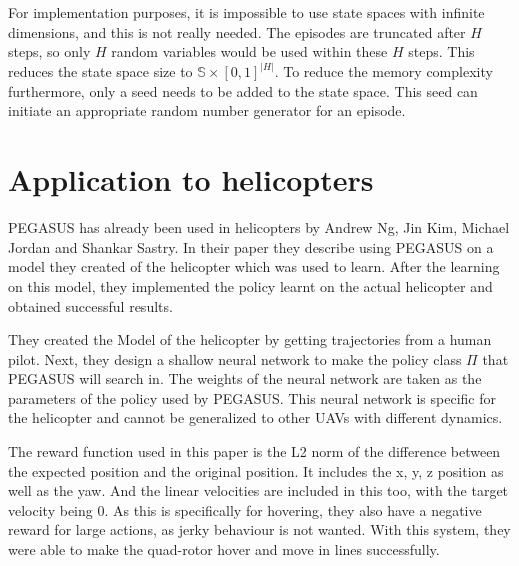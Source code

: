 \documentclass[hidelinks,BTech]{iitmdiss}
\begin{document}
For implementation purposes, it is impossible to use state spaces with infinite dimensions, and this is not really needed. The episodes are truncated after $H$ steps, so only $H$ random variables would be used within these $H$ steps. This reduces the state space size to $\mathbb{S} \times [0,1]^{|H|}$. To reduce the memory complexity furthermore, only a seed needs to be added to the state space. This seed can initiate an appropriate random number generator for an episode.

\section{Application to helicopters}

PEGASUS has already been used in helicopters \cite{HelicopterPegasus}  by Andrew Ng, Jin Kim, Michael Jordan and Shankar Sastry. In their paper they describe using PEGASUS on a model they created of the helicopter which was used to learn. After the learning on this model, they implemented the policy learnt on the actual helicopter and obtained successful results.

They created the Model of the helicopter by getting trajectories from a human pilot. Next, they design a shallow neural network to make the policy class $\Pi$ that PEGASUS will search in. The weights of the neural network are taken as the parameters of the policy used by PEGASUS. This neural network is specific for the helicopter and cannot be generalized to other UAVs with different dynamics.

The reward function used in this paper is the L2 norm of the difference between the expected position and the original position. It includes the x, y, z position as well as the yaw. And the linear velocities are included in this too, with the target velocity being 0. As this is specifically for hovering, they also have a negative reward for large actions, as jerky behaviour is not wanted. With this system, they were able to make the quad-rotor hover and move in lines successfully.
\end{document}
